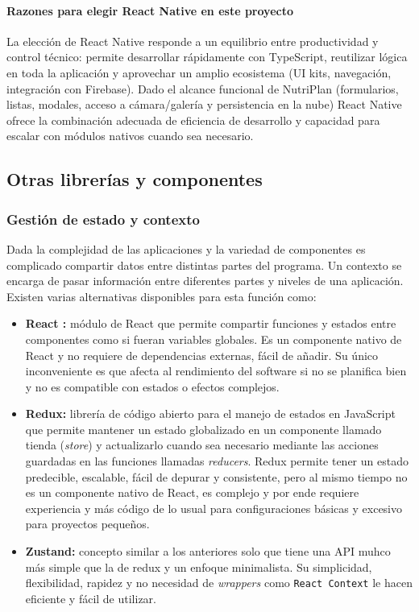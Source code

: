 \documentclass[twoside, openright, 11pt]{report}
\begin{document}
	\paragraph{Razones para elegir React Native en este proyecto}
	La elección de React Native responde a un equilibrio entre productividad y control técnico: permite desarrollar rápidamente con TypeScript, reutilizar lógica en toda la aplicación y aprovechar un amplio ecosistema (UI kits, navegación, integración con Firebase). Dado el alcance funcional de NutriPlan (formularios, listas, modales, acceso a cámara/galería y persistencia en la nube) React Native ofrece la combinación adecuada de eficiencia de desarrollo y capacidad para escalar con módulos nativos cuando sea necesario.

	\subsection{Otras librerías y componentes}
	
	
	\subsubsection*{Gestión de estado y contexto}
	Dada la complejidad de las aplicaciones y la variedad de componentes es complicado compartir datos entre distintas partes del programa. Un contexto se encarga de pasar información entre diferentes partes y niveles de una aplicación. Existen varias alternativas disponibles para esta función como:
	
	\begin{itemize}
		\item \textbf{React : } módulo de React que permite compartir funciones y estados entre componentes como si fueran variables globales. Es un componente nativo de React y no requiere de dependencias externas, fácil de añadir. Su único inconveniente es que afecta al rendimiento del software si no se planifica bien y no es compatible con estados o efectos complejos.
		\item \textbf{Redux: } librería de código abierto para el manejo de estados en JavaScript que permite mantener un estado globalizado en un componente llamado tienda (\textit{store}) y actualizarlo cuando sea necesario mediante las acciones guardadas en las funciones llamadas \textit{reducers}. Redux permite tener un estado predecible, escalable, fácil de depurar y consistente, pero al mismo tiempo no es un componente nativo de React, es complejo y por ende requiere experiencia y más código de lo usual para configuraciones básicas y excesivo para proyectos pequeños.
		\item \textbf{Zustand: } concepto similar a los anteriores solo que tiene una API muhco más simple que la de redux y un enfoque minimalista. Su simplicidad, flexibilidad, rapidez y no necesidad de \textit{wrappers} como \texttt{React Context} le hacen eficiente y fácil de utilizar.
	\end{itemize}
\end{document}
